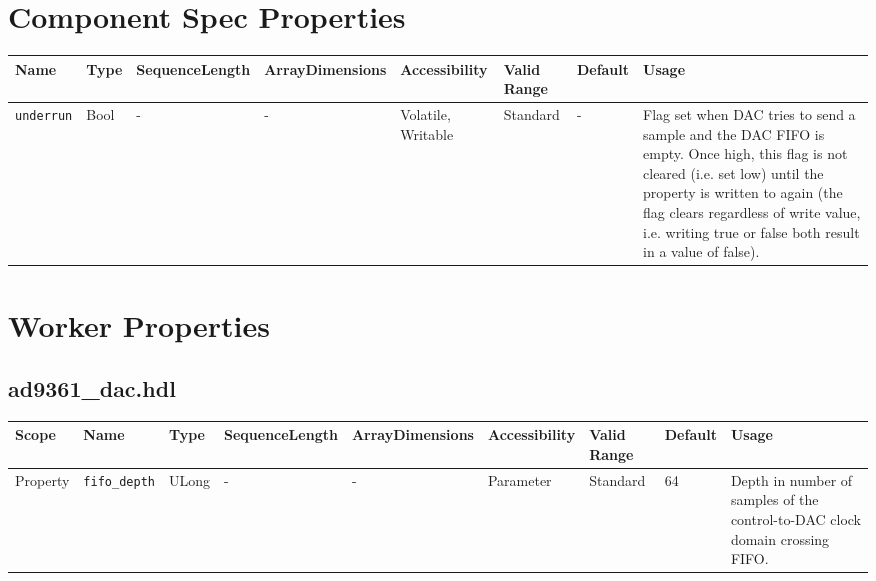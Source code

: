 \documentclass{article}
\def\comp{ad9361\_dac}
\begin{document}
\begin{landscape}

	\section*{Component Spec Properties}
	\begin{scriptsize}
		\begin{tabular}{|p{3.75cm}|p{1.25cm}|p{2cm}|p{2.75cm}|p{1.5cm}|p{1.5cm}|p{1cm}|p{6.62cm}|}
			\hline
			\rowcolor{blue}
			Name               & Type & SequenceLength & ArrayDimensions & Accessibility      & Valid Range & Default & Usage                                                                               \\
			\hline
			\verb+underrun+    & Bool & -              & -               & Volatile, Writable    & Standard    & -       & Flag set when DAC tries to send a sample and the DAC FIFO is empty. Once high, this flag is not cleared (i.e. set low) until the property is written to again (the flag clears regardless of write value, i.e. writing true or false both result in a value of false).\\
			\hline
		\end{tabular}
	\end{scriptsize}

	\section*{Worker Properties}
	\subsection*{\comp.hdl}
	\begin{scriptsize}
		\begin{tabular}{|p{2cm}|p{2cm}|p{1cm}|p{2cm}|p{2cm}|p{2cm}|p{2cm}|p{1cm}|p{5.95cm}|}
			\hline
			\rowcolor{blue}
			Scope        & Name                 & Type & SequenceLength & ArrayDimensions & Accessibility & Valid Range        & Default & Usage                                                                                                                  \\
			\hline
			Property     & \verb+fifo_depth+    & ULong& -              & -               & Parameter     & Standard           & 64      & Depth in number of samples of the control-to-DAC clock domain crossing FIFO. \\
			\hline
		\end{tabular}
	\end{scriptsize}


\end{landscape}
\end{document}
